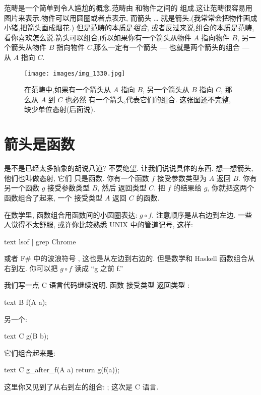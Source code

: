 
\lettrine[lhang=0.17]{范畴} 是一个简单到令人尴尬的概念.范畴由 
和物件之间的  组成.这让范畴很容易用图片来表示.物件可以用圆圈或者点表示,
而箭头 \ldots{} 就是箭头.(我常常会把物件画成小猪,把箭头画成烟花.) 但是范畴的本质是\emph{组合},
或者反过来说,组合的本质是范畴,看你喜欢怎么说.箭头可以组合,所以如果你有一个箭头从物件 $A$ 指向物件 $B$,
另一个箭头从物件 $B$ 指向物件 $C$,那么一定有一个箭头 --- 也就是两个箭头的组合 --- 从 $A$ 指向 $C$.

\begin{figure}
  \centering
  \texttt{[image: images/img\_1330.jpg]}
  \caption{在范畴中,如果有一个箭头从 $A$ 指向 $B$, 另一个箭头从 $B$ 指向 $C$, 那么从 $A$ 到 $C$ 也必然
  有一个箭头,代表它们的组合. 这张图还不完整,缺少单位态射(后面说).}
\end{figure}

\section{箭头是函数}

是不是已经太多抽象的胡说八道? 不要绝望. 让我们说说具体的东西. 想一想箭头, 他们也叫做态射, 它们
只是函数. 你有一个函数 $f$ 接受参数类型为 $A$ 返回 $B$. 你有另一个函数 $g$ 接受参数类型 $B$, 然后
返回类型 $C$. 把 $f$ 的结果给 $g$, 你就把这两个函数组合了起来, 一个 接受类型 $A$ 返回 $C$ 的函数.

在数学里, 函数组合用函数间的小圆圈表达: $g \circ f$. 注意顺序是从右边到左边. 一些人觉得不太舒服,
或许你比较熟悉 UNIX 中的管道记号, 这样:

\begin{snip}{text}
lsof | grep Chrome
\end{snip}
或者 F\# 中的波浪符号 \code{>>}, 这也是从左边到右边的. 但是数学和 Haskell 函数组合从右到左.
你可以把 $g \circ f$ 读成 ``g 之前 f.''

我们写一点 C 语言代码继续说明. 函数  接受类型  返回类型 :

\begin{snip}{text}
B f(A a);
\end{snip}
另一个:

\begin{snip}{text}
C g(B b);
\end{snip}
它们组合起来是:

\begin{snip}{text}
C g_after_f(A a)
{
    return g(f(a));
}
\end{snip}
这里你又见到了从右到左的组合: ; 这次是 C 语言.

